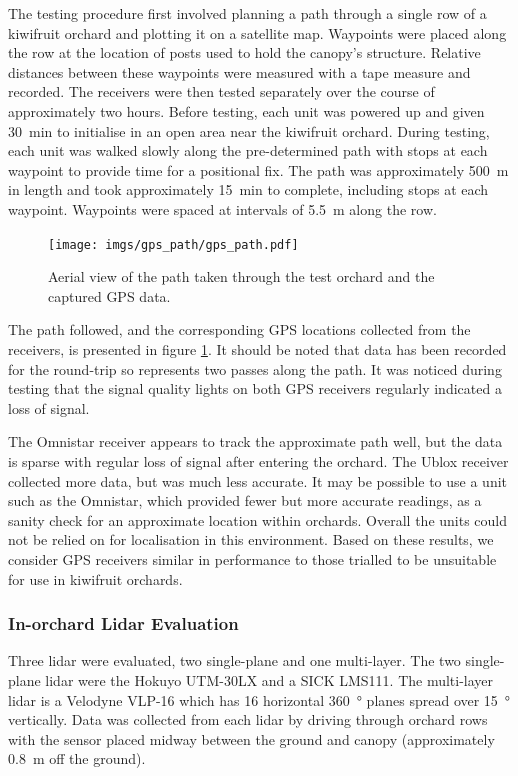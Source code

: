 \documentclass[preprint,authoryear,12pt]{elsarticle}
\begin{document}
        The testing procedure first involved planning a path through a single row of a kiwifruit orchard and plotting it on a satellite map.
        Waypoints were placed along the row at the location of posts used to hold the canopy's structure.
        Relative distances between these waypoints were measured with a tape measure and recorded.
        The receivers were then tested separately over the course of approximately two hours.
        Before testing, each unit was powered up and given \SI{30}{\minute} to initialise in an open area near the kiwifruit orchard.
        During testing, each unit was walked slowly along the pre-determined path with stops at each waypoint to provide time for a positional fix.
        The path was approximately \SI{500}{\meter} in length and took approximately \SI{15}{\minute} to complete, including stops at each waypoint.
        Waypoints were spaced at intervals of \SI{5.5}{\meter} along the row.

        \begin{figure}[htb]
            \centering
            \texttt{[image: imgs/gps\_path/gps\_path.pdf]}
            \caption{
                Aerial view of the path taken through the test orchard and the captured GPS data.
            }
            \label{fig:gpsResults}
        \end{figure}

        The path followed, and the corresponding GPS locations collected from the receivers, is presented in figure \ref{fig:gpsResults}.
        It should be noted that data has been recorded for the round-trip so represents two passes along the path.
        It was noticed during testing that the signal quality lights on both GPS receivers regularly indicated a loss of signal.

        The Omnistar receiver appears to track the approximate path well, but the data is sparse with regular loss of signal after entering the orchard.
    	The Ublox receiver collected more data, but was much less accurate.
        It may be possible to use a unit such as the Omnistar, which provided fewer but more accurate readings, as a sanity check for an approximate location within orchards.
        Overall the units could not be relied on for localisation in this environment.
        Based on these results, we consider GPS receivers similar in performance to those trialled to be unsuitable for use in kiwifruit orchards.

    \subsubsection{In-orchard Lidar Evaluation}
        Three lidar were evaluated, two single-plane and one multi-layer.
        The two single-plane lidar were the Hokuyo UTM-30LX and a SICK LMS111.
        The multi-layer lidar is a Velodyne VLP-16 which has 16 horizontal \SI{360}{\degree} planes spread over \SI{15}{\degree} vertically.
        Data was collected from each lidar by driving through orchard rows with the sensor placed midway between the ground and canopy (approximately \SI{0.8}{\meter} off the ground).
\end{document}
